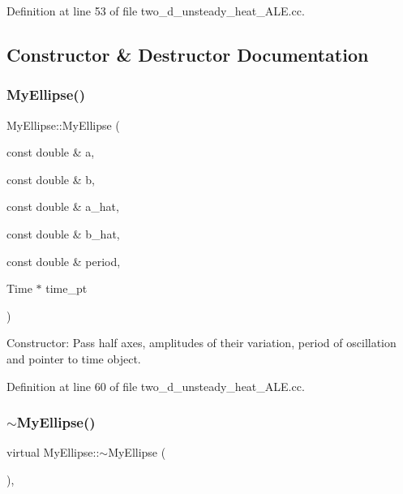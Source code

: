 Definition at line 53 of file two\+\_\+d\+\_\+unsteady\+\_\+heat\+\_\+\+A\+L\+E.\+cc.



\subsection{Constructor \& Destructor Documentation}
\mbox{\label{classMyEllipse_aaa00984813af171e611e420eb3433653}} 
\subsubsection{\texorpdfstring{My\+Ellipse()}{MyEllipse()}}
{\footnotesize\ttfamily My\+Ellipse\+::\+My\+Ellipse (\begin{DoxyParamCaption}\item[{const double \&}]{a,  }\item[{const double \&}]{b,  }\item[{const double \&}]{a\+\_\+hat,  }\item[{const double \&}]{b\+\_\+hat,  }\item[{const double \&}]{period,  }\item[{Time $\ast$}]{time\+\_\+pt }\end{DoxyParamCaption})\hspace{0.3cm}{\ttfamily [inline]}}



Constructor\+: Pass half axes, amplitudes of their variation, period of oscillation and pointer to time object. 



Definition at line 60 of file two\+\_\+d\+\_\+unsteady\+\_\+heat\+\_\+\+A\+L\+E.\+cc.

\mbox{\label{classMyEllipse_ac2f2d3fb269c57fb26b4db6d9a0c7c05}} 
\subsubsection{\texorpdfstring{$\sim$\+My\+Ellipse()}{~MyEllipse()}}
{\footnotesize\ttfamily virtual My\+Ellipse\+::$\sim$\+My\+Ellipse (\begin{DoxyParamCaption}{ }\end{DoxyParamCaption})\hspace{0.3cm}{\ttfamily [inline]}, {\ttfamily [virtual]}}



